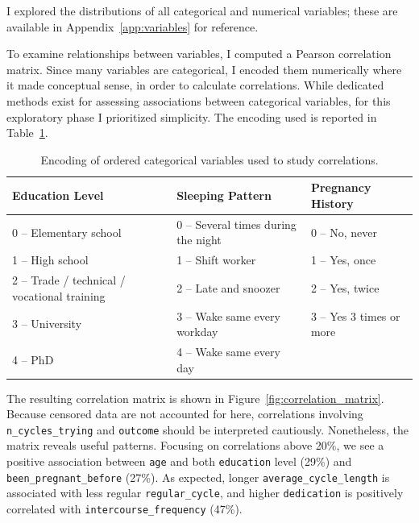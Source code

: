 \documentclass[11pt]{article}
\begin{document}
I explored the distributions of all categorical and numerical variables; these are available in Appendix~\ref{app:variables} for reference.

To examine relationships between variables, I computed a Pearson correlation matrix. Since many variables are categorical, I encoded them numerically where it made conceptual sense, in order to calculate correlations. While dedicated methods exist for assessing associations between categorical variables, for this exploratory phase I prioritized simplicity. The encoding used is reported in Table~\ref{tab:ordered_encodings}.

\begin{table}[h]
\centering
\caption{Encoding of ordered categorical variables used to study correlations.}
\label{tab:ordered_encodings}
\begin{tabularx}{\textwidth}{X X X}
\textbf{Education Level} & \textbf{Sleeping Pattern} & \textbf{Pregnancy History} \\
\hline
0 – Elementary school & 0 – Several times during the night & 0 – No, never \\
1 – High school & 1 – Shift worker & 1 – Yes, once \\
2 – Trade / technical / vocational training & 2 – Late and snoozer & 2 – Yes, twice \\
3 – University & 3 – Wake same every workday & 3 – Yes 3 times or more \\
4 – PhD & 4 – Wake same every day & \\
\end{tabularx}
\end{table}

The resulting correlation matrix is shown in Figure~\ref{fig:correlation_matrix}. Because censored data are not accounted for here, correlations involving \texttt{n\_cycles\_trying} and \texttt{outcome} should be interpreted cautiously. Nonetheless, the matrix reveals useful patterns. Focusing on correlations above 20\%, we see a positive association between \texttt{age} and both \texttt{education} level (29\%) and \texttt{been\_pregnant\_before} (27\%). As expected, longer \texttt{average\_cycle\_length} is associated with less regular \texttt{regular\_cycle}, and higher \texttt{dedication} is positively correlated with \texttt{intercourse\_frequency} (47\%).
\end{document}
